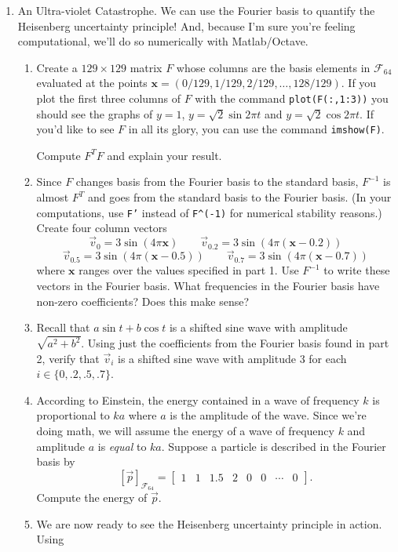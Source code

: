 \documentclass[letter]{article}
\newcommand{\mat}[1]{\begin{bmatrix}#1\end{bmatrix}}
\begin{document}
\begin{enumerate}
		\item {\sc An Ultra-violet Catastrophe}.  We can use the Fourier basis to quantify the Heisenberg uncertainty
			principle!  And, because I'm sure you're feeling computational, we'll do so numerically with Matlab/Octave.
			\begin{enumerate}
				\item Create a $129\times 129$ matrix $F$ whose columns are the basis elements in $\mathcal F_{64}$
					evaluated at the points $\mathbf x=(0/129,1/129,2/129,\ldots,128/129)$.  If you plot the first three columns of
					$F$ with the command {\tt plot(F(:,1:3))} you should see the graphs of $y=1$, $y=\sqrt{2}\sin 2\pi t$
					and $y=\sqrt{2}\cos 2\pi t$.  If you'd like to see $F$ in all its glory, you can use
					the command {\tt imshow(F)}.

					Compute $F^TF$ and explain your result.
				\item Since $F$ changes basis from the Fourier basis to the standard basis, $F^{-1}$ is almost $F^T$ and goes
					from the standard basis to the Fourier basis.  (In your computations, use {\tt F'} instead of
					{\tt F\textasciicircum(-1)} for numerical stability reasons.)  Create four column vectors
					\[
					\vec v_0=3\sin(4\pi \mathbf x)\qquad \vec v_{0.2}=3\sin(4\pi (\mathbf x-0.2))\]\[
						\vec v_{0.5}=3\sin(4\pi (\mathbf x-0.5))\qquad\vec v_{0.7}=3\sin(4\pi (\mathbf x-0.7))
					\]
					where $\mathbf x$ ranges over the values specified in part 1.  Use $F^{-1}$ to write
					these vectors in the Fourier basis.  What frequencies in the Fourier basis have non-zero coefficients?
					Does this make sense?
				\item Recall that $a\sin t+b\cos t$ is a shifted sine wave with amplitude $\sqrt{a^2+b^2}$.  Using just the 
					coefficients from the Fourier basis found in part 2, verify that $\vec v_i$ is a shifted sine wave
					with amplitude 3 for each $i\in\{0,.2,.5,.7\}$.
				\item According to Einstein, the energy contained in a wave of frequency $k$ is proportional to $ka$
					where $a$ is the amplitude of the wave.
					Since we're doing math, we will assume the energy of a wave of frequency $k$ and amplitude $a$
					is \emph{equal} to $ka$.  Suppose a particle is described in the Fourier basis by
					\[
						[\vec p]_{\mathcal F_{64}}=\mat{1&1&1.5&2&0&0&\cdots & 0}.
					\]
					Compute the energy of $\vec p$.
				\item We are now ready to see the Heisenberg uncertainty principle in action.  Using

\end{enumerate}
\end{enumerate}
\end{document}
